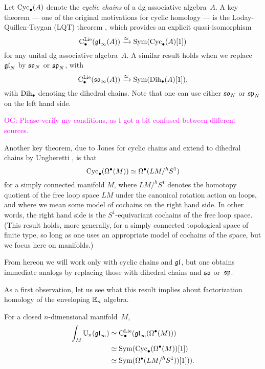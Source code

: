 \documentclass[11pt]{amsart}
\numberwithin{equation}{section}
\def\owen{\textcolor{magenta}{OG: }\textcolor{magenta}}
\begin{document}
Let ${\rm Cyc}_\bullet(A)$ denote the {\em cyclic chains} of a dg associative algebra~$A$.
A key theorem --- one of the original motivations for cyclic homology --- is the Loday-Quillen-Tsygan (LQT) theorem \cite{},
which provides an explicit quasi-isomorphism
\begin{equation}
\label{eqn: LQT}
{\rm C}^{\rm Lie}_\bullet({\mathfrak{gl}}_\infty(A)) \xrightarrow{\simeq} {\rm Sym}({\rm Cyc}_\bullet(A)[1])
\end{equation}
for any unital dg associative algebra~$A$.
A similar result \cite{} holds when we replace ${\mathfrak{gl}}_N$ by $\frak{so}_N$ or $\frak{sp}_N$, with
\[
\label{eqn: LQT}
{\rm C}^{\rm Lie}_\bullet({\frak{so}}_\infty(A)) \xrightarrow{\simeq} {\rm Sym}({\rm Dih}_\bullet(A)[1]),
\]
with ${\rm Dih}_\bullet$ denoting the dihedral chains.
Note that one can use either $\frak{so}_N$ or $\frak{sp}_N$ on the left hand side.

\owen{Please verify my conditions, as I got a bit confused between different sources.}

Another key theorem, due to Jones \cite{} for cyclic chains and extend to dihedral chains by Ungheretti \cite{},
is that
\[
{\rm Cyc}_\bullet(\Omega^\bullet(M)) \simeq \Omega^\bullet(LM/^h S^1)
\]
for a simply connected manifold $M$, 
where $LM/^h S^1$ denotes the homotopy quotient of the free loop space $LM$ under the canonical rotation action on loops,
and where we mean some model of cochains on the right hand side.
In other words, the right hand side is the $S^1$-equivariant cochains of the free loop space.
(This result holds, more generally, for a simply connected topological space of finite type, so long as one uses an appropriate model of cochains of the space, 
but we focus here on manifolds.)

From hereon we will work only with cyclic chains and ${\mathfrak{gl}}$,
but one obtains immediate analogs by replacing those with dihedral chains and $\frak{so}$ or~$\frak{sp}$.

As a first observation, let us see what this result implies about factorization homology of the enveloping $\mathbb E_n$ algebra.

\begin{lmm}
For a closed $n$-dimensional manifold~$M$, 
\begin{align*}
\int_M \mathbb U_n(\frak{gl}_\infty)
&\simeq {\rm C}^{\rm Lie}_\bullet({\mathfrak{gl}}_\infty(\Omega^\bullet(M) )) \\
&\simeq {\rm Sym}({\rm Cyc}_\bullet(\Omega^\bullet(M))[1]) \\
&\simeq {\rm Sym}(\Omega^\bullet(LM/^h S^1))[1])).
\end{align*}
\end{lmm}
\end{document}
